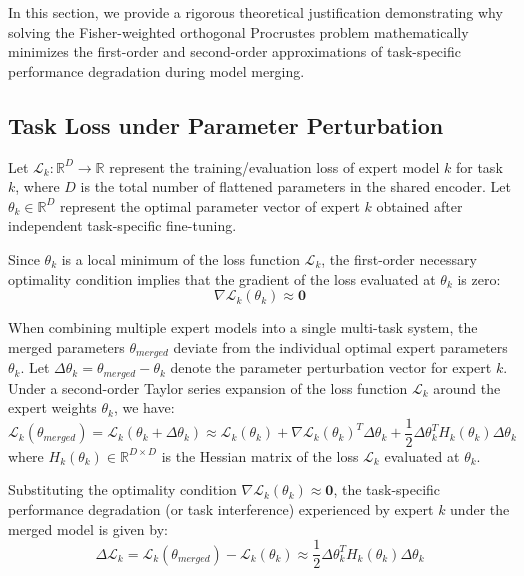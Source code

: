 \documentclass{article}
\theoremstyle{plain}
\theoremstyle{definition}
\theoremstyle{remark}
\begin{document}
In this section, we provide a rigorous theoretical justification demonstrating why solving the Fisher-weighted orthogonal Procrustes problem mathematically minimizes the first-order and second-order approximations of task-specific performance degradation during model merging.

\subsection{Task Loss under Parameter Perturbation}
Let $\mathcal{L}_k: \mathbb{R}^D \to \mathbb{R}$ represent the training/evaluation loss of expert model $k$ for task $k$, where $D$ is the total number of flattened parameters in the shared encoder. Let $\theta_k \in \mathbb{R}^D$ represent the optimal parameter vector of expert $k$ obtained after independent task-specific fine-tuning.

Since $\theta_k$ is a local minimum of the loss function $\mathcal{L}_k$, the first-order necessary optimality condition implies that the gradient of the loss evaluated at $\theta_k$ is zero:
\begin{equation}
    \nabla \mathcal{L}_k(\theta_k) \approx \mathbf{0}
\end{equation}

When combining multiple expert models into a single multi-task system, the merged parameters $\theta_{merged}$ deviate from the individual optimal expert parameters $\theta_k$. Let $\Delta \theta_k = \theta_{merged} - \theta_k$ denote the parameter perturbation vector for expert $k$. Under a second-order Taylor series expansion of the loss function $\mathcal{L}_k$ around the expert weights $\theta_k$, we have:
\begin{equation}
    \mathcal{L}_k(\theta_{merged}) = \mathcal{L}_k(\theta_k + \Delta \theta_k) \approx \mathcal{L}_k(\theta_k) + \nabla \mathcal{L}_k(\theta_k)^T \Delta \theta_k + \frac{1}{2} \Delta \theta_k^T H_k(\theta_k) \Delta \theta_k
\end{equation}
where $H_k(\theta_k) \in \mathbb{R}^{D \times D}$ is the Hessian matrix of the loss $\mathcal{L}_k$ evaluated at $\theta_k$. 

Substituting the optimality condition $\nabla \mathcal{L}_k(\theta_k) \approx \mathbf{0}$, the task-specific performance degradation (or task interference) experienced by expert $k$ under the merged model is given by:
\begin{equation}
    \Delta \mathcal{L}_k = \mathcal{L}_k(\theta_{merged}) - \mathcal{L}_k(\theta_k) \approx \frac{1}{2} \Delta \theta_k^T H_k(\theta_k) \Delta \theta_k
\end{equation}
\end{document}
